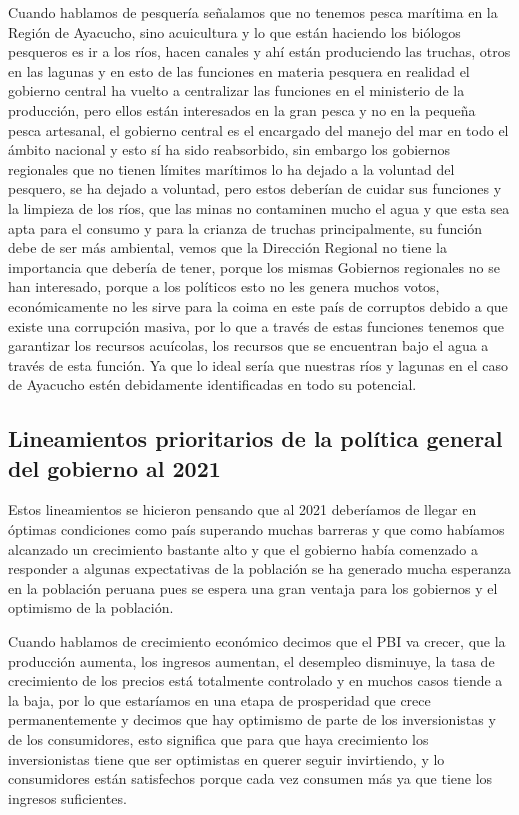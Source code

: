 \documentclass[
  letterpaper,
  DIV=11,
  numbers=noendperiod]{scrartcl}
\begin{document}
Cuando hablamos de pesquería señalamos que no tenemos pesca marítima en
la Región de Ayacucho, sino acuicultura y lo que están haciendo los
biólogos pesqueros es ir a los ríos, hacen canales y ahí están
produciendo las truchas, otros en las lagunas y en esto de las funciones
en materia pesquera en realidad el gobierno central ha vuelto a
centralizar las funciones en el ministerio de la producción, pero ellos
están interesados en la gran pesca y no en la pequeña pesca artesanal,
el gobierno central es el encargado del manejo del mar en todo el ámbito
nacional y esto sí ha sido reabsorbido, sin embargo los gobiernos
regionales que no tienen límites marítimos lo ha dejado a la voluntad
del pesquero, se ha dejado a voluntad, pero estos deberían de cuidar sus
funciones y la limpieza de los ríos, que las minas no contaminen mucho
el agua y que esta sea apta para el consumo y para la crianza de truchas
principalmente, su función debe de ser más ambiental, vemos que la
Dirección Regional no tiene la importancia que debería de tener, porque
los mismas Gobiernos regionales no se han interesado, porque a los
políticos esto no les genera muchos votos, económicamente no les sirve
para la coima en este país de corruptos debido a que existe una
corrupción masiva, por lo que a través de estas funciones tenemos que
garantizar los recursos acuícolas, los recursos que se encuentran bajo
el agua a través de esta función. Ya que lo ideal sería que nuestras
ríos y lagunas en el caso de Ayacucho estén debidamente identificadas en
todo su potencial.

\hypertarget{lineamientos-prioritarios-de-la-poluxedtica-general-del-gobierno-al-2021}{%
\subsection{Lineamientos prioritarios de la política general del
gobierno al
2021}\label{lineamientos-prioritarios-de-la-poluxedtica-general-del-gobierno-al-2021}}

Estos lineamientos se hicieron pensando que al 2021 deberíamos de llegar
en óptimas condiciones como país superando muchas barreras y que como
habíamos alcanzado un crecimiento bastante alto y que el gobierno había
comenzado a responder a algunas expectativas de la población se ha
generado mucha esperanza en la población peruana pues se espera una gran
ventaja para los gobiernos y el optimismo de la población.

Cuando hablamos de crecimiento económico decimos que el PBI va crecer,
que la producción aumenta, los ingresos aumentan, el desempleo
disminuye, la tasa de crecimiento de los precios está totalmente
controlado y en muchos casos tiende a la baja, por lo que estaríamos en
una etapa de prosperidad que crece permanentemente y decimos que hay
optimismo de parte de los inversionistas y de los consumidores, esto
significa que para que haya crecimiento los inversionistas tiene que ser
optimistas en querer seguir invirtiendo, y lo consumidores están
satisfechos porque cada vez consumen más ya que tiene los ingresos
suficientes.
\end{document}
